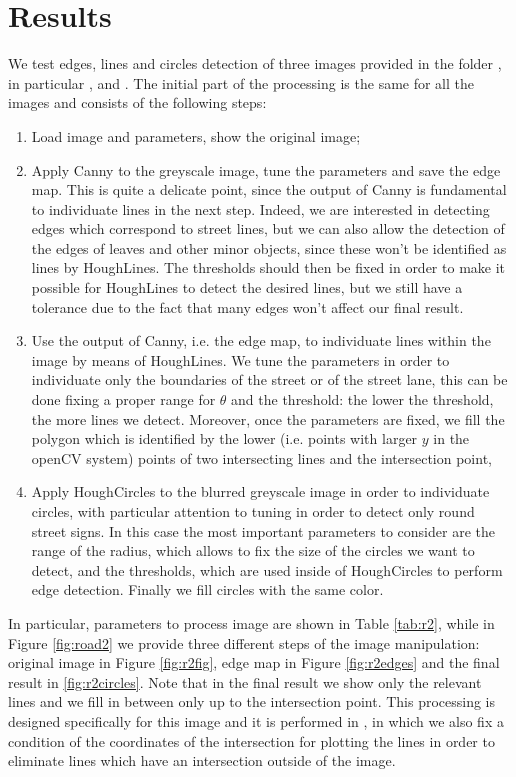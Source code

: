 \documentclass[twoside,onecolumn]{article}
\theoremstyle{definition}
\begin{document}
\section{Results}
We test edges, lines and circles detection of three images provided in the folder , in particular ,   and .
The initial part of the processing is the same for all the images and consists of the following steps:
\begin{enumerate}
\item Load image and parameters, show the original image;
\item Apply Canny to the greyscale image, tune the parameters and save the edge map. This is quite a delicate point, since the output of Canny is fundamental to individuate lines in the next step. Indeed, we are interested in detecting edges which correspond to street lines, but we can also allow the detection of the edges of leaves and other minor objects, since these won't be identified as lines by HoughLines. The thresholds should then be fixed in order to make it possible for HoughLines to detect the desired lines, but we still have a tolerance due to the fact that many edges won't affect our final result. 
\item Use the output of Canny, i.e. the edge map, to individuate lines within the image by means of HoughLines. We tune the parameters in order to individuate only the boundaries of the street or of the street lane, this can be done fixing a proper range  for $\theta$ and the threshold: the lower the threshold, the more lines we detect. Moreover, once the parameters are fixed, we fill the polygon which is identified by the lower (i.e. points with larger $y$ in the openCV system) points of two intersecting lines and the intersection point,
\item  Apply HoughCircles to the blurred greyscale image in order to individuate circles, with particular attention to tuning in order to detect only round street signs. In this case the most important parameters to consider are the range of the radius, which allows to fix the size of the circles we want to detect, and the thresholds, which are used inside of HoughCircles to perform edge detection. Finally we fill circles with the same color.
\end{enumerate}

In particular, parameters to process image  are shown in Table \ref{tab:r2}, while in Figure \ref{fig:road2} we provide three different steps of the image manipulation: original image in Figure \ref{fig:r2fig}, edge map in Figure \ref{fig:r2edges} and the final result in \ref{fig:r2circles}. Note that in the final result we show only the relevant lines and we fill in between only up to the intersection point. This processing is designed specifically for this image and it is performed in , in which we also fix a condition of the coordinates of the intersection for plotting the lines in order to eliminate lines which have an intersection outside of the image.
 
\end{document}
